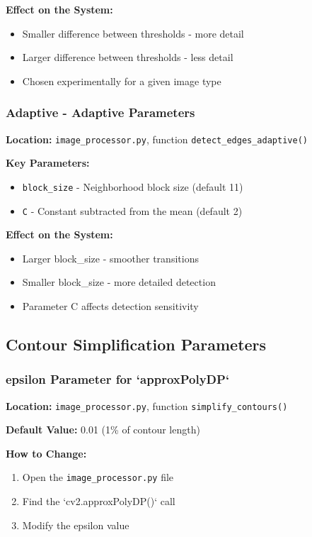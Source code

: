 \documentclass[a4paper,12pt]{article}
\begin{document}
\textbf{Effect on the System:}
\begin{itemize}
\item Smaller difference between thresholds - more detail
\item Larger difference between thresholds - less detail
\item Chosen experimentally for a given image type
\end{itemize}

\subsubsection{Adaptive - Adaptive Parameters}
\textbf{Location:} \texttt{image\_processor.py}, function \texttt{detect\_edges\_adaptive()}

\textbf{Key Parameters:}
\begin{itemize}
\item \texttt{block\_size} - Neighborhood block size (default 11)
\item \texttt{C} - Constant subtracted from the mean (default 2)
\end{itemize}

\textbf{Effect on the System:}
\begin{itemize}
\item Larger block\_size - smoother transitions
\item Smaller block\_size - more detailed detection
\item Parameter C affects detection sensitivity
\end{itemize}

\subsection{Contour Simplification Parameters}

\subsubsection{epsilon Parameter for `approxPolyDP`}
\textbf{Location:} \texttt{image\_processor.py}, function \texttt{simplify\_contours()}

\textbf{Default Value:} 0.01 (1\% of contour length)

\textbf{How to Change:}
\begin{enumerate}
\item Open the \texttt{image\_processor.py} file
\item Find the `cv2.approxPolyDP()` call
\item Modify the epsilon value
\end{enumerate}
\end{document}
